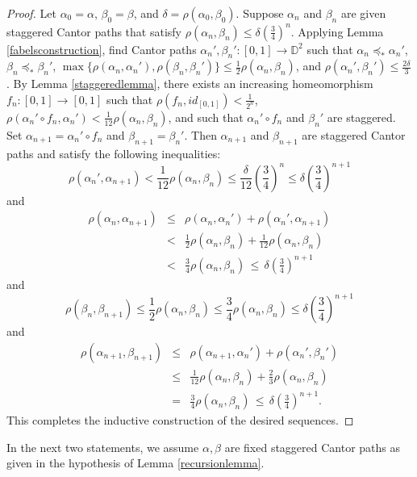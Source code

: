\documentclass[12pt, leqno]{amsart}
\newcommand{\ord}{\preceq_{\ast}}
\newcommand{\ui}{[0,1]}
\newcommand{\bbd}{\mathbb{D}}
\theoremstyle{definition}\newtheorem{definition}[theorem]{Definition}
\begin{document}
\begin{proof}
Let $\alpha_0=\alpha$, $\beta_0=\beta$, and $\delta=\rho(\alpha_0,\beta_0)$. Suppose $\alpha_n$ and $\beta_n$ are given staggered Cantor paths that satisfy $\rho(\alpha_n,\beta_n)\leq \delta\left(\frac{3}{4}\right)^{n}$. Applying Lemma \ref{fabelsconstruction}, find Cantor paths $\alpha_{n}',\beta_{n}':\ui\to \bbd^2$ such that $\alpha_n\ord \alpha_{n}'$, $\beta_{n}\ord \beta_{n}'$, $\max\{\rho(\alpha_n,\alpha_{n}'),\rho(\beta_n,\beta_{n}')\}\leq \frac{1}{2}\rho(\alpha_n,\beta_n)$, and $\rho(\alpha_{n}',\beta_{n}')\leq \frac{2\delta}{3}$. By Lemma \ref{staggeredlemma}, there exists an increasing homeomorphism $f_n:\ui\to \ui$ such that $\rho(f_n,id_{\ui})<\frac{1}{2^n}$, $\rho(\alpha_{n}'\circ f_n,\alpha_{n}')<\frac{1}{12}\rho(\alpha_n,\beta_n)$, and such that $\alpha_{n}'\circ f_n$ and $\beta_{n}'$ are staggered. Set $\alpha_{n+1}=\alpha_{n}'\circ f_n$ and $\beta_{n+1}=\beta_{n}'$. Then $\alpha_{n+1}$ and $\beta_{n+1}$ are staggered Cantor paths and satisfy the following inequalities:
\[\rho(\alpha_{n}',\alpha_{n+1})<\frac{1}{12}\rho(\alpha_n,\beta_n)\leq \frac{\delta}{12}\left(\frac{3}{4}\right)^{n}\leq \delta\left(\frac{3}{4}\right)^{n+1}\]
and
\begin{eqnarray*}
\rho(\alpha_n,\alpha_{n+1}) &\leq& \rho(\alpha_n,\alpha_{n}')+\rho(\alpha_{n}',\alpha_{n+1})\\
&<&
\frac{1}{2}\rho(\alpha_n,\beta_n)+\frac{1}{12}\rho(\alpha_n,\beta_n)\\
&<& \frac{3}{4}\rho(\alpha_n,\beta_n) \,\leq \, \delta\left(\frac{3}{4}\right)^{n+1}
\end{eqnarray*}
and
\[\rho(\beta_n,\beta_{n+1}) \leq \frac{1}{2}\rho(\alpha_n,\beta_n)\leq \frac{3}{4}\rho(\alpha_n,\beta_n)\leq  \delta\left(\frac{3}{4}\right)^{n+1} \]
and
\begin{eqnarray*}
\rho(\alpha_{n+1},\beta_{n+1}) &\leq& \rho(\alpha_{n+1},\alpha_{n}')+\rho(\alpha_{n}',\beta_{n}')\\
&\leq& \frac{1}{12}\rho(\alpha_n,\beta_n)+\frac{2}{3}\rho(\alpha_n,\beta_n)\\
&= & \frac{3}{4}\rho(\alpha_n,\beta_n) \,\leq \, \delta\left(\frac{3}{4}\right)^{n+1}.
\end{eqnarray*}
This completes the inductive construction of the desired sequences.
\end{proof}

In the next two statements, we assume $\alpha,\beta$ are fixed staggered Cantor paths as given in the hypothesis of Lemma \ref{recursionlemma}.
\end{document}
